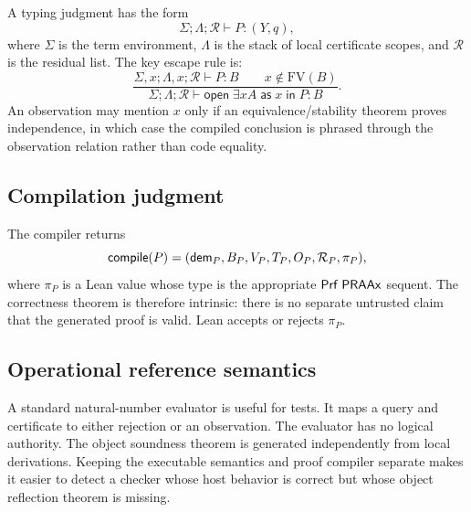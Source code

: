 A typing judgment has the form
\[
   \Sigma;\Lambda;\mathcal R\vdash P:(Y,q),
\]
where \(\Sigma\) is the term environment, \(\Lambda\) is the stack of local
certificate scopes, and \(\mathcal R\) is the residual list.  The key escape
rule is:
\[
 \frac{\Sigma,x;\Lambda,x;\mathcal R\vdash P:B
       \qquad x\notin\mathrm{FV}(B)}
      {\Sigma;\Lambda;\mathcal R\vdash
       \mathsf{open}\;\exists x A\;\mathsf{as}\;x\;\mathsf{in}\;P:B}.
\]
An observation may mention \(x\) only if an equivalence/stability theorem
proves independence, in which case the compiled conclusion is phrased through
the observation relation rather than code equality.

\subsection{Compilation judgment}

The compiler returns
\[
 \mathsf{compile}(P)=
 (\mathsf{dem}_P,B_P,V_P,T_P,O_P,\mathcal R_P,\pi_P),
\]
where \(\pi_P\) is a Lean value whose type is the appropriate
\(\mathsf{Prf}\;\mathsf{PRAAx}\) sequent.  The correctness theorem is therefore intrinsic:
there is no separate untrusted claim that the generated proof is valid.  Lean
accepts or rejects \(\pi_P\).

\subsection{Operational reference semantics}

A standard natural-number evaluator is useful for tests.  It maps a query and
certificate to either rejection or an observation.  The evaluator has no
logical authority.  The object soundness theorem is generated independently
from local derivations.  Keeping the executable semantics and proof compiler
separate makes it easier to detect a checker whose host behavior is correct but
whose object reflection theorem is missing.
